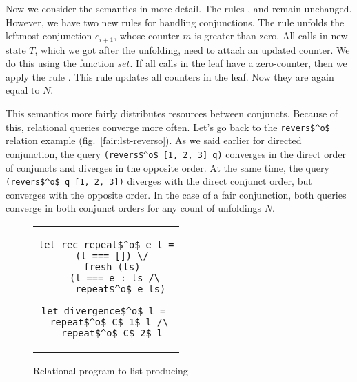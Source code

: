 Now we consider the semantics in more detail. The rules ,  and  remain unchanged. However, we have two new rules for handling conjunctions. The  rule unfolds the leftmost conjunction $c_{i + 1}$, whose counter $m$ is greater than zero. All calls in new state $T$, which we got after the unfolding, need to attach an updated counter. We do this using the function $set$. If all calls in the leaf have a zero-counter, then we apply the rule . This rule updates all counters in the leaf. Now they are again equal to $N$.

This semantics more fairly distributes resources between conjuncts. Because of this, relational queries converge more often. Let's go back to the \lstinline{revers$^o$} relation example (fig.~\ref{fair:lst-reverso}). As we said earlier for directed conjunction, the query \lstinline{(revers$^o$ [1, 2, 3] q)} converges in the direct order of conjuncts and diverges in the opposite order. At the same time, the query \lstinline{(revers$^o$ q [1, 2, 3])} diverges with the direct conjunct order, but converges with the opposite order. In the case of a fair conjunction, both queries converge in both conjunct orders for any count of unfoldings $N$. 

\begin{figure}[h!]
\centering
\begin{tabular}{c}
\begin{lstlisting}
let rec repeat$^o$ e l =
  (l === []) \/
  fresh (ls)
    (l === e : ls /\ 
     repeat$^o$ e ls)
     
let divergence$^o$ l = 
  repeat$^o$ C$_1$ l /\ 
  repeat$^o$ C$_2$ l
\end{lstlisting}
\end{tabular}

\caption{Relational program to list producing}
\label{fair:lst-repeato}
\end{figure}

